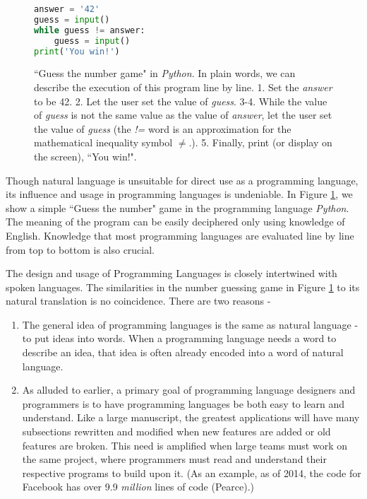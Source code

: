 \documentclass[12pt]{article}
\begin{document}
\begin{flushleft}
\begin{figure}[h]
\centering
\caption{
``Guess the number game" in \textit{Python}.
In plain words, we can describe the execution of this
program line by line.
1. Set the \textit{answer} to be 42.
2. Let the user set the value of \textit{guess}.
3-4. While the value of \textit{guess} is not the same value
as the value of \textit{answer},
let the user set the value of \textit{guess} (the \textit{!=} word is an approximation
for the mathematical inequality symbol $\neq$.).
5. Finally, print (or display on the screen), ``You win!".
}
\begin{lstlisting}[language=Python]
answer = '42'
guess = input()
while guess != answer:
    guess = input()
print('You win!')
\end{lstlisting}
\label{fig:guess_number}
\end{figure}

Though natural language is unsuitable for direct use as a programming
language, its influence and usage in programming languages is undeniable.
In Figure \ref{fig:guess_number}, we show a simple ``Guess the number" game
in the programming language \textit{Python}.
The meaning of the program can be easily deciphered only using knowledge
of English. Knowledge that most programming languages are evaluated line
by line from top to bottom is also crucial.

The design and usage of Programming Languages is closely intertwined with spoken languages.
The similarities in the number guessing game in Figure \ref{fig:guess_number}
to its natural translation is no coincidence.
There are two reasons -
\begin{enumerate}
\item The general idea of programming languages is the same as natural
language - to put ideas into words. When a programming language needs
a word to describe an idea, that idea is often already encoded into
a word of natural language.
\item As alluded to earlier, a primary goal of programming language
designers and programmers is to have programming languages be both easy to
learn and understand. Like a large manuscript, the greatest applications
will have many subsections rewritten and modified when new features are
added or old features are broken. This need is amplified when large
teams must work on the same project, where programmers must read and
understand their respective programs to build upon it.
(As an example, as of 2014, the code
for Facebook has over 9.9 \textit{million} lines of code (Pearce).)


\end{enumerate}
\end{flushleft}
\end{document}

